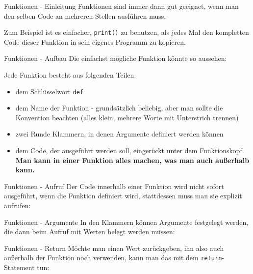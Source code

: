 \begin{frame}{Funktionen - Einleitung}
	Funktionen sind immer dann gut geeignet, wenn man den selben Code an mehreren Stellen ausführen muss.
		
	Zum Beispiel ist es einfacher, \alert{\texttt{print()}} zu benutzen, als jedes Mal den kompletten Code dieser Funktion in sein eigenes Programm zu kopieren.
\end{frame}

\begin{frame}{Funktionen - Aufbau}
	Die einfachst mögliche Funktion könnte so aussehen:
	
	\pause
	Jede Funktion besteht aus folgenden Teilen:
	\pause
	\begin{itemize}
		\item dem Schlüsselwort \alert{\texttt{def}}
		\pause
		\item dem Name der Funktion - grundsätzlich beliebig, aber man sollte  die Konvention beachten (alles klein, mehrere Worte mit Unterstrich trennen)
		\pause
		\item zwei Runde Klammern, in denen Argumente definiert werden können
		\pause
		\item dem Code, der ausgeführt werden soll, eingerückt unter dem Funktionskopf. \textbf{Man kann in einer Funktion alles machen, was man auch außerhalb kann.}
	\end{itemize}
\end{frame}

\begin{frame}{Funktionen - Aufruf}
	Der Code innerhalb einer Funktion wird nicht sofort ausgeführt, wenn die Funktion definiert wird, stattdessen muss man sie explizit aufrufen:
	
\end{frame}

\begin{frame}{Funktionen - Argumente}
	In den Klammern können Argumente festgelegt werden, die dann beim Aufruf mit Werten belegt werden müssen:
	
\end{frame}

\begin{frame}{Funktionen - Return}
	Möchte man einen Wert zurückgeben, ihn also auch außerhalb der Funktion noch verwenden, kann man das mit dem \alert{\texttt{return}}-Statement tun:
	
\end{frame}

